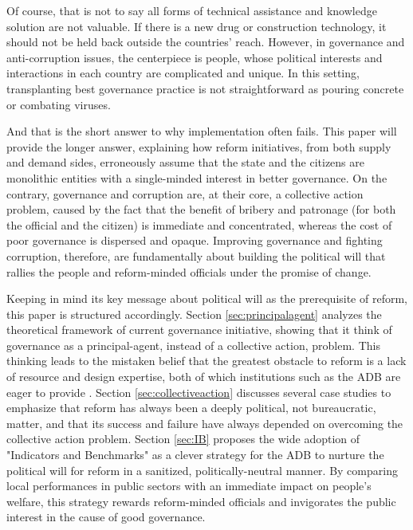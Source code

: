 \documentclass[12pt]{article}
\begin{document}
Of course, that is not to say all forms of technical assistance and knowledge solution are not valuable. If there is a new drug or construction technology, it should not be held back outside the countries' reach. However, in governance and anti-corruption issues, the centerpiece is people, whose political interests and interactions in each country are complicated and unique. In this setting, transplanting best governance practice is not straightforward as pouring concrete or combating viruses.

And that is the short answer to why implementation often fails. This paper will provide the longer answer, explaining how reform initiatives, from both supply and demand sides, erroneously assume that the state and the citizens are monolithic entities with a single-minded interest in better governance. On the contrary, governance and corruption are, at their core, a collective action problem, caused by the fact that the benefit of bribery and patronage (for both the official and the citizen) is immediate and concentrated, whereas the cost of poor governance is dispersed and opaque. Improving governance and fighting corruption, therefore, are fundamentally about building the political will that rallies the people and reform-minded officials under the promise of change.

Keeping in mind its key message about political will as the prerequisite of reform, this paper is structured accordingly. Section \ref{sec:principalagent} analyzes the theoretical framework of current governance initiative, showing that it think of governance as a principal-agent, instead of a collective action, problem. This thinking leads to the mistaken belief that the greatest obstacle to reform is a lack of resource and design expertise, both of which institutions such as the ADB are eager to provide \citep[16]{GlobalIntegrity2012}. Section \ref{sec:collectiveaction} discusses several case studies to emphasize that reform has always been a deeply political, not bureaucratic, matter, and that its success and failure have always depended on overcoming the collective action problem. Section \ref{sec:IB} proposes the wide adoption of "Indicators and Benchmarks" as a clever strategy for the ADB to nurture the political will for reform in a sanitized, politically-neutral manner. By comparing local performances in public sectors with an immediate impact on people's welfare, this strategy rewards reform-minded officials and invigorates the public interest in the cause of good governance.
\end{document}
